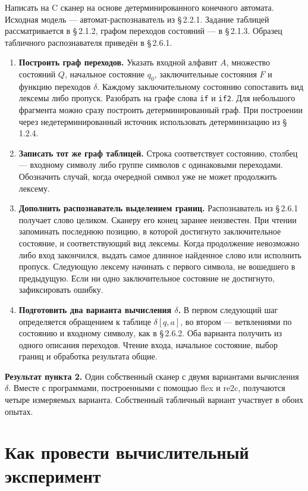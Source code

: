 \documentclass[12pt,a4paper]{article}
\newcommand{\parag}[1]{\S\,#1}
\newcommand{\code}[1]{\texttt{#1}}
\newcommand{\task}[1]{\par\medskip\noindent\textbf{#1}\quad}
\begin{document}
Написать на C сканер на основе детерминированного конечного автомата. Исходная модель --- автомат-распознаватель из \parag{2.2.1}. Задание таблицей рассматривается в \parag{2.1.2}, графом переходов состояний --- в \parag{2.1.3}. Образец табличного распознавателя приведён в \parag{2.6.1}.

\begin{enumerate}
\item \textbf{Построить граф переходов.} Указать входной алфавит $A$, множество состояний $Q$, начальное состояние $q_0$, заключительные состояния $F$ и функцию переходов $\delta$. Каждому заключительному состоянию сопоставить вид лексемы либо пропуск. Разобрать на графе слова \code{if} и \code{if2}. Для небольшого фрагмента можно сразу построить детерминированный граф. При построении через недетерминированный источник использовать детерминизацию из \parag{1.2.4}.
\item \textbf{Записать тот же граф таблицей.} Строка соответствует состоянию, столбец --- входному символу либо группе символов с одинаковыми переходами. Обозначить случай, когда очередной символ уже не может продолжить лексему.
\item \textbf{Дополнить распознаватель выделением границ.} Распознаватель из \parag{2.6.1} получает слово целиком. Сканеру его конец заранее неизвестен. При чтении запоминать последнюю позицию, в которой достигнуто заключительное состояние, и соответствующий вид лексемы. Когда продолжение невозможно либо вход закончился, выдать самое длинное найденное слово или исполнить пропуск. Следующую лексему начинать с первого символа, не вошедшего в предыдущую. Если ни одно заключительное состояние не достигнуто, зафиксировать ошибку.
\item \textbf{Подготовить два варианта вычисления $\delta$.} В первом следующий шаг определяется обращением к таблице $\delta[q,a]$, во втором --- ветвлениями по состоянию и входному символу, как в \parag{2.6.2}. Оба варианта получить из одного описания переходов. Чтение входа, начальное состояние, выбор границ и обработка результата общие.
\end{enumerate}

\task{Результат пункта 2.} Один собственный сканер с двумя вариантами вычисления $\delta$. Вместе с программами, построенными с помощью flex и re2c, получаются четыре измеряемых варианта. Собственный табличный вариант участвует в обоих опытах.

\section{Как провести вычислительный эксперимент}
\end{document}
